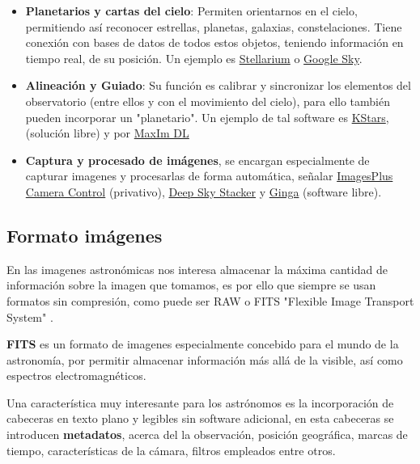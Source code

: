 \begin{itemize}
	\item \textbf{Planetarios y cartas del cielo}: Permiten orientarnos en el cielo, permitiendo así reconocer estrellas, planetas, galaxias, constelaciones. Tiene conexión con bases de datos de todos estos objetos, teniendo información en tiempo real, de su posición. Un ejemplo es \href{http://www.stellarium.org/es/}{Stellarium} o \href{https://www.google.com/intl/es_es/sky/}{Google Sky}.
	
	\item \textbf{Alineación y Guiado}: Su función es calibrar y sincronizar los elementos del observatorio (entre ellos y con el movimiento del cielo), para ello también pueden incorporar un "planetario". Un ejemplo de tal software es \href{https://edu.kde.org/kstars/}{KStars}, (solución libre) y por \href{http://www.cyanogen.com/maxim_main.php}{MaxIm DL}
	
	\item \textbf{Captura y procesado de imágenes}, se encargan especialmente de capturar imagenes y procesarlas de forma automática, señalar \href{http://www.mlunsold.com/}{ImagesPlus Camera Control} (privativo), \href{http://deepskystacker.free.fr/spanish/index.html}{Deep Sky Stacker} y \href{https://github.com/ejeschke/ginga}{Ginga} (software libre). 
	
	
\end{itemize}

\subsection{Formato imágenes}

En las imagenes astronómicas nos interesa almacenar la máxima cantidad de información sobre la imagen que tomamos, es por ello que siempre se usan formatos sin compresión, como puede ser RAW \cite{Raw} o FITS "Flexible Image Transport System"  \cite{FITS}.

\bigskip
\textbf{FITS} es un formato de imagenes especialmente concebido para el mundo de la astronomía, por permitir almacenar información más allá de la visible, así como espectros electromagnéticos.

\bigskip
Una característica muy interesante para los astrónomos es la incorporación de cabeceras en texto plano y legibles sin software adicional, en esta cabeceras se introducen \textbf{metadatos}, acerca del la observación,  posición geográfica, marcas de tiempo,  características de la cámara, filtros empleados entre otros.

